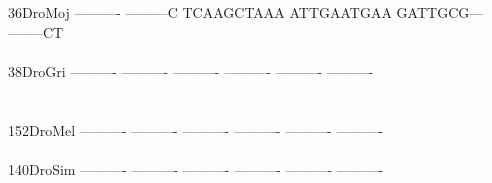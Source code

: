\documentclass[11pt,twoside,reqno,a4paper]{article}
\begin{document}
{36\hspace*{3\charwidth}DroMoj	----------	---------C	TCAAGCTAAA	ATTGAATGAA	GATTGCG---	--------CT	\\
\hspace*{5\charwidth}\hspace*{7\charwidth}\hspace*{1\charwidth}\hspace*{1\charwidth}\hspace*{1\charwidth}\hspace*{1\charwidth}\hspace*{1\charwidth}\hspace*{1\charwidth}\\
38\hspace*{3\charwidth}DroGri	----------	----------	----------	----------	----------	----------	\\
\hspace*{5\charwidth}\hspace*{7\charwidth}\hspace*{1\charwidth}\hspace*{1\charwidth}\hspace*{1\charwidth}\hspace*{1\charwidth}\hspace*{1\charwidth}\hspace*{1\charwidth}\\
\\
152\hspace*{2\charwidth}DroMel	----------	----------	----------	----------	----------	----------	\\
\hspace*{5\charwidth}\hspace*{7\charwidth}\hspace*{1\charwidth}\hspace*{1\charwidth}\hspace*{1\charwidth}\hspace*{1\charwidth}\hspace*{1\charwidth}\hspace*{1\charwidth}\\
140\hspace*{2\charwidth}DroSim	----------	----------	----------	----------	----------	----------	\\
\hspace*{5\charwidth}\hspace*{7\charwidth}\hspace*{1\charwidth}\hspace*{1\charwidth}\hspace*{1\charwidth}\hspace*{1\charwidth}\hspace*{1\charwidth}\hspace*{1\charwidth}\\
}
\end{document}
